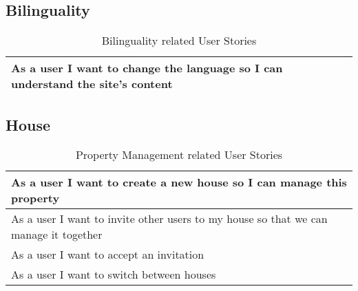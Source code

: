 \subsection{Bilinguality}
\begin{table}[H]
  \begin{tabularx}{\linewidth}{|X|}
    \hline
      As a user I want to change the language so I can understand the site's content \\
     \hline
  \end{tabularx}
  \caption{Bilinguality related User Stories}
\end{table}

\subsection{House}
\begin{table}[H]
  \begin{tabularx}{\linewidth}{|X|}
    \hline
      As a user I want to create a new house so I can manage this property \\
     \hline
      As a user I want to invite other users to my house so that we can manage it together \\
     \hline
      As a user I want to accept an invitation \\
     \hline
      As a user I want to switch between houses \\
     \hline 
  \end{tabularx}
  \caption{Property Management related User Stories}
\end{table}
